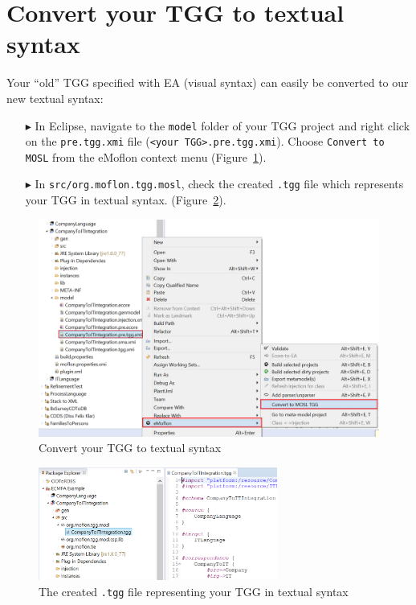 \newpage

\section{Convert your TGG to textual syntax}
\genHeader

Your ``old'' TGG specified with EA (visual syntax) can easily be
converted to our new textual syntax:

\begin{enumerate}

\item[$\blacktriangleright$] In Eclipse, navigate to the \texttt{model} folder
of your TGG project and right click on the \texttt{pre.tgg.xmi} file
(\texttt{<your TGG>.pre.tgg.xmi}).
Choose \texttt{Convert to MOSL} from the eMoflon context menu
(Figure~\ref{fig:convertToMOSL}).


\item[$\blacktriangleright$] In \texttt{src/org.moflon.tgg.mosl}, check the
created \texttt{.tgg} file which represents your TGG in textual syntax.
(Figure~\ref{fig:tggfile}).
\end{enumerate}

\begin{figure}[h]
\begin{center}
 	\includegraphics[width=\textwidth]{convertToMOSL}
	\caption{Convert your TGG to textual syntax}
  	\label{fig:convertToMOSL}
\end{center}

\end{figure}
\begin{figure}[h]
\begin{center}
 	\includegraphics[width=0.7\textwidth]{tggfile}
	\caption{The created \texttt{.tgg} file representing your TGG in textual
	syntax}
  	\label{fig:tggfile}
\end{center}
\end{figure}